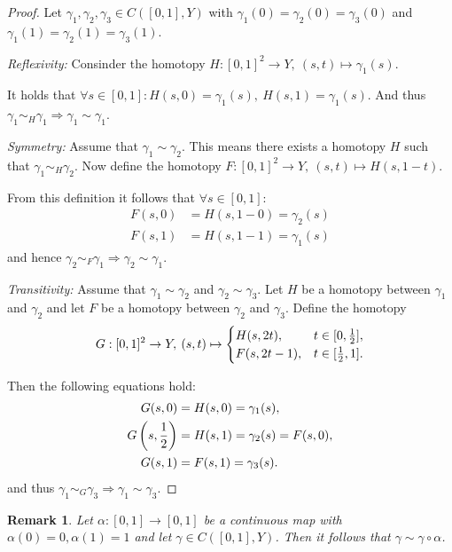\documentclass{article}
\theoremstyle{break}
\theoremstyle{break}
\newtheorem{rem}[thm]{Remark}
\begin{document}
\begin{proof}
  Let $\gamma_1, \gamma_2, \gamma_3 \in C([0,1],Y)$ with $\gamma_1(0) = \gamma_2(0) = \gamma_3(0)$ and $\gamma_1(1) = \gamma_2(1) = \gamma_3(1)$.
  
  \textit{Reflexivity:}
  Consinder the homotopy $H: [0,1]^2 \to Y, \: (s, t) \mapsto \gamma_1(s)$. 
  
  It holds that $\forall s\in [0,1]: H(s, 0) = \gamma_1(s),\: H(s, 1) = \gamma_1(s)$. And thus $\gamma_1 \sim_H \gamma_1 \Rightarrow \gamma_1 \sim \gamma_1$.

  \textit{Symmetry:} 
  Assume that $\gamma_1 \sim \gamma_2$. This means there exists a homotopy $H$ such that $\gamma_1 \sim_H \gamma_2$. 
  Now define the homotopy $F: [0,1]^2 \to Y, \: (s, t) \mapsto H(s, 1-t)$. 
  
  From this definition it follows that $\forall s \in [0,1]:$
  \begin{align*}
    F(s, 0) &= H(s, 1 - 0) = \gamma_2(s) \\
    F(s, 1) &= H(s, 1 - 1) = \gamma_1(s)
  \end{align*}
  and hence $\gamma_2 \sim_F \gamma_1 \Rightarrow \gamma_2 \sim \gamma_1$.

  \textit{Transitivity:}
  Assume that $\gamma_1 \sim \gamma_2$ and $\gamma_2 \sim \gamma_3$. Let $H$ be a homotopy between $\gamma_1$ and $\gamma_2$ and let $F$ be a homotopy between $\gamma_2$ and $\gamma_3$. 
  Define the homotopy
  \begin{equation*} 
    G: [0,1]^2 \to Y, \: (s,t) \mapsto \begin{cases}
      H(s, 2t), &t \in [0, {1 \over 2}], \\
      F(s, 2t - 1), &t \in [{1 \over 2}, 1].
    \end{cases}
  \end{equation*}

  Then the following equations hold:
  \begin{align*}
    G(s,0) &= H(s,0) = \gamma_1(s), \\
    G\left(s,{1 \over 2}\right) &= H(s, 1) = \gamma_2(s) = F(s, 0), \\
    G(s, 1) &= F(s, 1) = \gamma_3(s).
  \end{align*}
  and thus $\gamma_1 \sim_G \gamma_3 \Rightarrow \gamma_1 \sim \gamma_3$.
\end{proof}

\begin{rem} \label{rem:reparam}
  Let $\alpha: [0,1] \to [0,1]$ be a continuous map with $\alpha(0) = 0, \alpha(1) = 1$ and let $\gamma \in C([0,1], Y)$. Then it follows that $\gamma \sim \gamma \circ \alpha$.
\end{rem}
\end{document}
